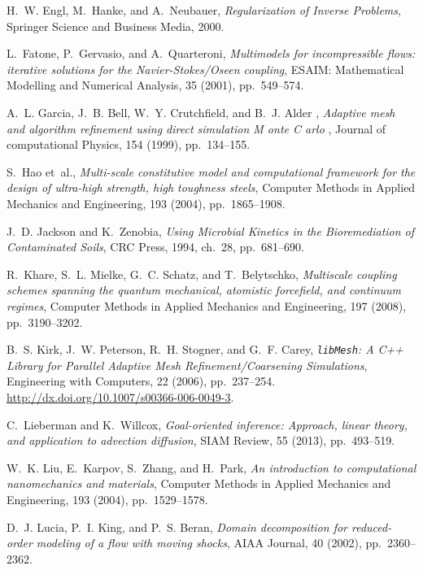 \documentclass[review]{siamart0516}
\providecommand{\DIFaddtex}[1]{{\protect\color{blue} \sf #1}} %
\providecommand{\DIFaddbegin}{} %
\providecommand{\DIFaddend}{} %
\providecommand{\DIFadd}[1]{\texorpdfstring{\DIFaddtex{#1}}{#1}} %
\newcommand{\DIFaddincludegraphics}[2][]{{\color{blue}\fbox{\DIFOincludegraphics[#1]{#2}}}} %
\DeclareRobustCommand{\DIFaddbegin}{\DIFOaddbegin \let\includegraphics\DIFaddincludegraphics} %
\DeclareRobustCommand{\DIFaddend}{\DIFOaddend \let\includegraphics\DIFOincludegraphics} %
\begin{document}
\begin{thebibliography}{10}
{\sc H.~W. Engl, M.~Hanke, and A.~Neubauer}, {\em Regularization of Inverse
  Problems}, Springer Science and Business Media, 2000.

{\sc L.~Fatone, P.~Gervasio, and A.~Quarteroni}, {\em Multimodels for
  incompressible flows: iterative solutions for the {N}avier-{S}tokes/{O}seen
  coupling}, ESAIM: Mathematical Modelling and Numerical Analysis, 35 (2001),
  pp.~549--574.

\DIFaddbegin {}
{\sc \DIFadd{A.~L. Garcia, J.~B. Bell, W.~Y. Crutchfield, and B.~J. Alder}}\DIFadd{, }{\em
  \DIFadd{Adaptive mesh and algorithm refinement using direct simulation }{\DIFadd{M}}\DIFadd{onte
  }{\DIFadd{C}}\DIFadd{arlo}}\DIFadd{, Journal of computational Physics, 154 (1999), pp.~134--155.
}

\DIFaddend {}
{\sc S.~Hao et~al.}, {\em Multi-scale constitutive model and computational
  framework for the design of ultra-high strength, high toughness steels},
  Computer Methods in Applied Mechanics and Engineering, 193 (2004),
  pp.~1865--1908.

{\sc J.~D. Jackson and K.~Zenobia}, {\em Using Microbial Kinetics in the
  Bioremediation of Contaminated Soils}, CRC Press, 1994, ch.~28, pp.~681--690.

{\sc R.~Khare, S.~L. Mielke, G.~C. Schatz, and T.~Belytschko}, {\em Multiscale
  coupling schemes spanning the quantum mechanical, atomistic forcefield, and
  continuum regimes}, Computer Methods in Applied Mechanics and Engineering,
  197 (2008), pp.~3190--3202.

{\sc B.~S. Kirk, J.~W. Peterson, R.~H. Stogner, and G.~F. Carey}, {\em
  {\texttt{libMesh}: A {C}++ Library for Parallel Adaptive Mesh
  Refinement/Coarsening Simulations}}, Engineering with Computers, 22 (2006),
  pp.~237--254.
\newblock \url{http://dx.doi.org/10.1007/s00366-006-0049-3}.

{\sc C.~Lieberman and K.~Willcox}, {\em Goal-oriented inference: Approach,
  linear theory, and application to advection diffusion}, SIAM Review, 55
  (2013), pp.~493--519.

{\sc W.~K. Liu, E.~Karpov, S.~Zhang, and H.~Park}, {\em An introduction to
  computational nanomechanics and materials}, Computer Methods in Applied
  Mechanics and Engineering, 193 (2004), pp.~1529--1578.

{\sc D.~J. Lucia, P.~I. King, and P.~S. Beran}, {\em Domain decomposition for
  reduced-order modeling of a flow with moving shocks}, AIAA Journal, 40
  (2002), pp.~2360--2362.


\end{thebibliography}
\end{document}
